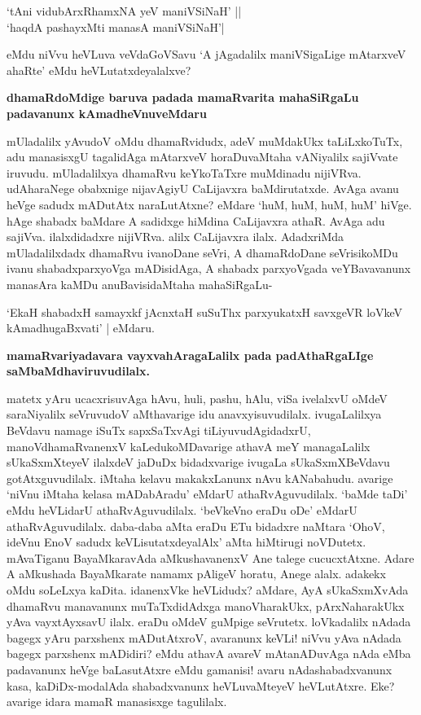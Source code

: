 \begin{shloka}
`tAni vidubArxRhamxNA yeV maniVSiNaH' ||\\\label{205}
`haqdA pashayxMti manasA maniVSiNaH'|\label{205}
\end{shloka}

eMdu niVvu heVLuva veVdaGoVSavu `A jAgadalilx maniVSigaLige mAtarxveV ahaRte' eMdu heVLutatxdeyalalxve?

\noindent
{\bf\large{dhamaRdoMdige baruva padada mamaRvarita mahaSiRgaLu padavanunx kAmadheVnuveMdaru}}\label{page205}

mUladalilx yAvudoV oMdu dhamaRvidudx, adeV muMdakUkx taLiLxkoTuTx, adu manasisxgU tagalidAga mAtarxveV horaDuvaMtaha vANiyalilx sajiVvate iruvudu. mUladalilxya dhamaRvu keYkoTaTxre muMdinadu nijiVRva. udAharaNege obabxnige nijavAgiyU CaLijavxra baMdirutatxde. AvAga avanu heVge sadudx mADutAtx naraLutAtxne? eMdare `huM, huM, huM, huM' hiVge. hAge shabadx baMdare A sadidxge hiMdina CaLijavxra athaR. AvAga adu sajiVva. ilalxdidadxre nijiVRva. alilx CaLijavxra ilalx. AdadxriMda mUladalilxdadx dhamaRvu ivanoDane seVri, A dhamaRdoDane seVrisikoMDu ivanu shabadxparxyoVga mADisidAga, A shabadx parxyoVgada veYBavavanunx manasAra kaMDu anuBavisidaMtaha mahaSiRgaLu-

\begin{shloka}
`EkaH shabadxH samayxkf jAcnxtaH suSuThx parxyukatxH savxgeVR loVkeV kAmadhugaBxvati' | eMdaru.\label{205}
\end{shloka}

\noindent
{\bf\large{mamaRvariyadavara vayxvahAragaLalilx pada padAthaRgaLIge saMbaMdhaviruvudilalx.}}\label{page205}

matetx yAru ucacxrisuvAga hAvu, huli, pashu, hAlu, viSa ivelalxvU oMdeV saraNiyalilx seVruvudoV aMthavarige idu anavxyisuvudilalx. ivugaLalilxya BeVdavu namage iSuTx sapxSaTxvAgi tiLiyuvudAgidadxrU, manoVdhamaRvanenxV kaLedukoMDavarige athavA meY managaLalilx sUkaSxmXteyeV ilalxdeV jaDuDx bidadxvarige ivugaLa sUkaSxmXBeVdavu gotAtxguvudilalx. iMtaha kelavu makakxLanunx nAvu kANabahudu. avarige `niVnu iMtaha kelasa mADabAradu' eMdarU athaRvAguvudilalx. `baMde taDi' eMdu heVLidarU athaRvAguvudilalx. `beVkeVno eraDu oDe' eMdarU athaRvAguvudilalx. daba-daba aMta eraDu ETu bidadxre naMtara `OhoV, ideVnu EnoV sadudx keVLisutatxdeyalAlx' aMta hiMtirugi noVDutetx. mAvaTiganu BayaMkaravAda aMkushavanenxV Ane talege cucucxtAtxne. Adare A aMkushada BayaMkarate namamx pAligeV horatu, Anege alalx. adakekx oMdu soLeLxya kaDita. idanenxVke heVLidudx? aMdare, AyA sUkaSxmXvAda dhamaRvu manavanunx muTaTxdidAdxga manoVharakUkx, pArxNaharakUkx yAva vayxtAyxsavU ilalx. eraDu oMdeV guMpige seVrutetx. loVkadalilx nAdada bagegx yAru parxshenx mADutAtxroV, avaranunx keVLi! niVvu yAva nAdada bagegx parxshenx mADidiri? eMdu athavA avareV mAtanADuvAga nAda eMba padavanunx heVge baLasutAtxre eMdu gamanisi! avaru nAdashabadxvanunx kasa, kaDiDx-modalAda shabadxvanunx heVLuvaMteyeV heVLutAtxre. Eke? avarige idara mamaR manasisxge tagulilalx.

